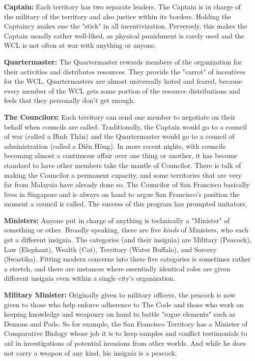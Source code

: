 \textbf{Captain:} Each territory has two separate leaders. The Captain is in charge of the military of the territory and also justice within its borders. Holding the Captaincy makes one the "stick" in all incentivization. Perversely, this makes the Captain usually rather well-liked, as physical punishment is rarely used and the WCL is not often at war with anything or anyone.

\textbf{Quartermaster:} The Quartermaster rewards members of the organization for their activities and distributes resources. They provide the "carrot" of incentives for the WCL. Quartermasters are almost universally hated and feared, because every member of the WCL gets some portion of the resource distributions and feels that they personally don't get enough.

\textbf{The Councilors:} Each territory can send one member to negotiate on their behalf when councils are called. Traditionally, the Captain would go to a council of war (called a B\`{\i}nh Th\^{a}n) and the Quartermaster would go to a council of administration (called a Di\^{e}n H\~{o}ng). In more recent nights, with councils becoming almost a continuous affair over one thing or another, it has become standard to have other members take the mantle of Councilor. There is talk of making the Councilor a permanent capacity, and some territories that are very far from Malaysia have already done so. The Councilor of San Francisco basically lives in Singapore and is always on hand to argue San Francisco's position the moment a council is called. The success of this program has prompted imitators.

\textbf{Ministers:} Anyone put in charge of anything is technically a "Minister" of something or other. Broadly speaking, there are five \textit{kinds} of Ministers, who each get a different insignia. The categories (and their insignia) are Military (Peacock), Law (Elephant), Wealth (Cat), Territory (Water Buffalo), and Sorcery (Swastika). Fitting modern concerns into these five categories is sometimes rather a stretch, and there are instances where essentially identical roles are given different insignia even within a single city's organization.

\textbf{Military Minister:} Originally given to military officers, the peacock is now given to those who help enforce adherence to The Code and those who work on keeping knowledge and weaponry on hand to battle "rogue elements" such as Demons and Pods. So for example, the San Francisco Territory has a Minister of Comparative Biology whose job it is to keep samples and conflict testimonials to aid in investigations of potential invasions from other worlds. And while he does not carry a weapon of any kind, his insignia is a peacock.


